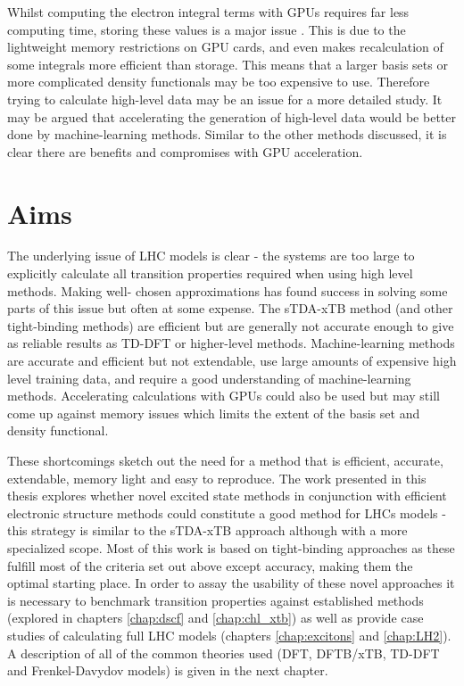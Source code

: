 Whilst computing the electron integral terms with GPUs requires far less computing 
time, storing these values is a major issue \cite{Sisto2014a}. This is due to the
lightweight memory restrictions on GPU cards, and even makes recalculation of some
integrals more efficient than storage. This means that a larger basis sets or more
complicated density functionals may be too expensive to use. Therefore trying to
calculate high-level data may be an issue for a more detailed study. It may be argued
that accelerating the generation of high-level data would be better done by machine-learning
methods. Similar to the other methods discussed, it is clear there are benefits 
and compromises with GPU acceleration.

\section{Aims}
\label{sec:possible_novel_methods}

The underlying issue of LHC models is clear - the systems are too large to explicitly
calculate all transition properties required when using high level methods. Making
well- chosen approximations has found success in solving some parts of this issue
but often at some expense. The sTDA-xTB method (and other tight-binding methods) 
are efficient but are generally not accurate enough to give as reliable results 
as TD-DFT or higher-level methods. Machine-learning methods are accurate and efficient
but not extendable, use large amounts of expensive high level training data, and
require a good understanding of machine-learning methods. Accelerating calculations 
with GPUs could also be used but may still come up against memory issues which limits 
the extent of the basis set and density functional.

These shortcomings sketch out the need for a method that is efficient, accurate,
extendable, memory light and easy to reproduce. The work presented in this thesis
explores whether novel excited state methods in conjunction with efficient electronic 
structure methods could constitute a good method for LHCs models - this strategy 
is similar to the sTDA-xTB approach although with a more specialized scope. Most 
of this work is based on tight-binding approaches as these fulfill most of the criteria 
set out above except accuracy, making them the optimal starting place. In order 
to assay the usability of these novel approaches it is necessary to benchmark transition 
properties against established methods (explored in chapters \ref{chap:dscf} and 
\ref{chap:chl_xtb}) as well as provide case studies of calculating full LHC models 
(chapters \ref{chap:excitons} and \ref{chap:LH2}). A description of all of the common 
theories used (DFT, DFTB/xTB, TD-DFT and Frenkel-Davydov models) is given in the 
next chapter.

